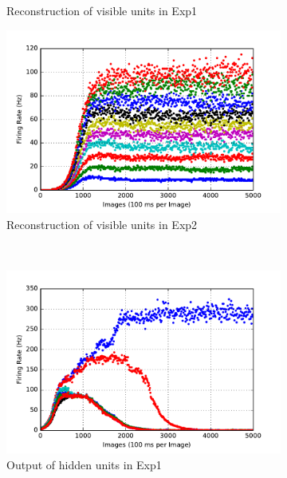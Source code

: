 \begin{figure}
\begin{subfigure}[t]{0.4\textwidth}
		\caption{Reconstruction of visible units in Exp1}
	\end{subfigure}
	\begin{subfigure}[t]{0.4\textwidth}
		\includegraphics[width=\textwidth]{pics_sdlm/11_exp_SRBM_Orig_long/exp2_recon_s.pdf}
		\caption{Reconstruction of visible units in Exp2}
	\end{subfigure}\\
	\begin{subfigure}[t]{0.4\textwidth}
		\includegraphics[width=\textwidth]{pics_sdlm/11_exp_SRBM_Orig_long/exp1_hid_s.pdf}
		\caption{Output of hidden units in Exp1}
	\end{subfigure}
	\begin{subfigure}[t]{0.4\textwidth}

\end{subfigure}
\end{figure}
